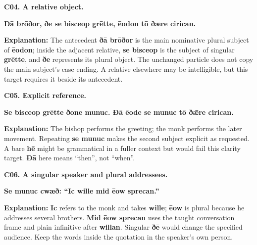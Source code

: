 \par\begin{minipage}{\linewidth}\raggedright
\textbf{C04. A relative object.}

\textbf{Ðā brōðor, ðe se bisceop grētte, ēodon tō ðǣre cirican.}

\textbf{Explanation:} The antecedent \textbf{ðā brōðor} is the main nominative plural subject of \textbf{ēodon}; inside the adjacent relative, \textbf{se bisceop} is the subject of singular \textbf{grētte}, and \textbf{ðe} represents its plural object. The unchanged particle does not copy the main subject’s case ending. A relative elsewhere may be intelligible, but this target requires it beside its antecedent.

\end{minipage}\par\addvspace{4pt}

\par\begin{minipage}{\linewidth}\raggedright
\textbf{C05. Explicit reference.}

\textbf{Se bisceop grētte ðone munuc. Ðā ēode se munuc tō ðǣre cirican.}

\textbf{Explanation:} The bishop performs the greeting; the monk performs the later movement. Repeating \textbf{se munuc} makes the second subject explicit as requested. A bare \textbf{hē} might be grammatical in a fuller context but would fail this clarity target. \textbf{Ðā} here means “then”, not “when”.

\end{minipage}\par\addvspace{4pt}

\par\begin{minipage}{\linewidth}\raggedright
\textbf{C06. A singular speaker and plural addressees.}

\textbf{Se munuc cwæð: “Ic wille mid ēow sprecan.”}

\textbf{Explanation:} \textbf{Ic} refers to the monk and takes \textbf{wille}; \textbf{ēow} is plural because he addresses several brothers. \textbf{Mid ēow sprecan} uses the taught conversation frame and plain infinitive after \textbf{willan}. Singular \textbf{ðē} would change the specified audience. Keep the words inside the quotation in the speaker’s own person.

\end{minipage}\par\addvspace{4pt}

